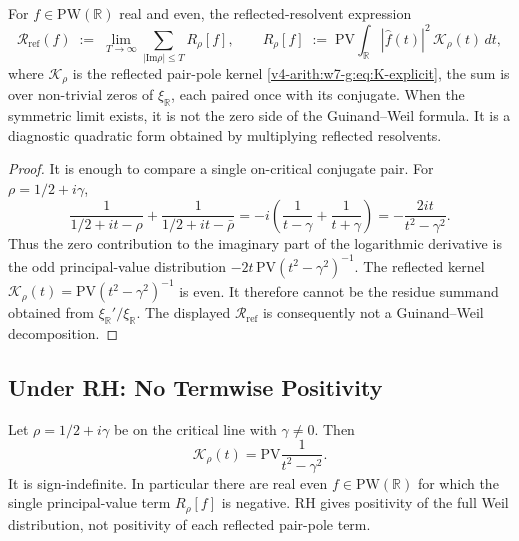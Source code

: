 \begin{theorem}
\label{v4-arith:w7-g:thm:guinand-weil-pair-pole}
For \(f\in\mathrm{PW}(\mathbb{R})\) real and
even, the reflected-resolvent expression
\begin{equation}
\label{v4-arith:w7-g:eq:guinand-weil}
\mathcal R_{\mathrm{ref}}(f)\;:=\;\lim_{T\to\infty}\sum_{|\mathrm{Im}\rho|\leq T}R_{\rho}[f],
\qquad
R_{\rho}[f]\;:=\;\mathrm{PV}\!\int_{\mathbb{R}}|\widehat{f}(t)|^{2}\,\mathcal{K}_{\rho}(t)\,dt,
\end{equation}
where \(\mathcal{K}_{\rho}\) is the reflected pair-pole kernel
\eqref{v4-arith:w7-g:eq:K-explicit}, the sum is over non-trivial
zeros of \(\xi_{\mathbb{R}}\), each paired once with its conjugate. When
the symmetric limit exists, it is not the zero side of the
Guinand--Weil formula. It is a diagnostic quadratic form obtained by
multiplying reflected resolvents.
\end{theorem}

\begin{proof}
It is enough to compare a single on-critical conjugate pair.  For
\(\rho=1/2+i\gamma\),
\[
\frac{1}{1/2+it-\rho}+\frac{1}{1/2+it-\bar\rho}
=-i\left(\frac{1}{t-\gamma}+\frac{1}{t+\gamma}\right)
=-\frac{2it}{t^{2}-\gamma^{2}} .
\]
Thus the zero contribution to the imaginary part of the logarithmic
derivative is the odd principal-value distribution
\(-2t\,\mathrm{PV}(t^{2}-\gamma^{2})^{-1}\).  The reflected kernel
\(\mathcal K_{\rho}(t)=\mathrm{PV}(t^{2}-\gamma^{2})^{-1}\) is even.
It therefore cannot be the residue summand obtained from
\(\xi_{\mathbb R}'/\xi_{\mathbb R}\). The displayed
\(\mathcal R_{\mathrm{ref}}\) is consequently not a Guinand--Weil
decomposition.
\end{proof}

\subsection{Under RH: No Termwise Positivity}
\label{v4-arith:w7-g:pair-pole:RH-positivity}

\begin{proposition}
\label{v4-arith:w7-g:prop:pointwise-RH}
Let \(\rho=1/2+i\gamma\) be on the critical
line with \(\gamma\neq0\). Then
\begin{equation}
\label{v4-arith:w7-g:eq:pointwise-RH}
\mathcal K_{\rho}(t)=\mathrm{PV}\frac{1}{t^{2}-\gamma^{2}}.
\end{equation}
It is sign-indefinite. In particular there are real even
\(f\in\mathrm{PW}(\mathbb R)\) for which the single principal-value
term \(R_{\rho}[f]\) is negative. RH gives positivity of the full Weil
distribution, not positivity of each reflected pair-pole term.
\end{proposition}

